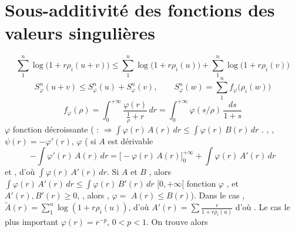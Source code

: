 \documentclass[11pt,a4paper]{article}
\begin{document}
\section{Sous-additivité des fonctions des valeurs singulières}


\[
  \sum_{1}^{n} \log\bigl(1 + r\rho_i(u+v)\bigr) \leq \sum_{1}^{n} \log\bigl(1 + r\rho_i(u)\bigr) + \sum_{1}^{n} \log\bigl(1 + r\rho_i(v)\bigr)
\]
\[
  S_\varphi^{n}(u+v) \leq S_\varphi^{n}(u) + S_\varphi^{n}(v), \qquad S_\varphi^{n}(w) = \sum_{1}^{n} f_\varphi\bigl(\rho_i(w)\bigr)
\]
\[
  f_\varphi(\rho) = \int_{0}^{+\infty} \frac{\varphi(r)}{\frac{1}{\rho} + r}\, dr = \int_{0}^{+\infty} \varphi(s/\rho)\, \frac{ds}{1+s}
\]
$\varphi$ fonction décroissante  ( :  $\Longrightarrow \int \varphi(r)\, A(r)\, dr \leq \int \varphi(r)\, B(r)\, dr$ \ill{} . , \ill{}  \struck{\ill{}} \ill{}  \ill{},  \ill{} $\psi(r) = -\varphi'(r)$, $\varphi$ \ill{} (\struck{\ill{}} \ill{} si $A$ est dérivable
\[
  -\int \varphi'(r)\, A(r)\, dr = \bigl[-\varphi(r)\, A(r)\bigr]_{0}^{+\infty} + \int \varphi(r)\, A'(r)\, dr
\]
et     , d'où \ill{} $\int \varphi(r)\, A'(r)\, dr$. Si \ill{} $A$ et $B$  , alors \ill{} $\int \varphi(r)\, A'(r)\, dr \leq \int \varphi(r)\, B'(r)\, dr$ \ill{}   $[0, +\infty[$ \ill{} fonction $\varphi$ \ill{}, \ill{}  \ill{} et \ill{} $A'(r), B'(r) \geq 0$, \ill{}, alors \ill{}      \ill{},   \ill{} $\varphi = $  \ill{} $A(r) \leq B(r)$). \ill{} \struck{\ill{}} \ill{}  \ill{} Dans le cas , $\tilde{A}(r) = \sum_{1}^{n} \log(1 + r\rho_i(u))$, d'où \ill{} $A'(r) = \sum \frac{r}{1 + r\rho_i(u)}$  d'où \ill{} . Le cas le plus important      $\varphi(r) = r^{-p}$, $0 < p < 1$. On trouve alors
\end{document}
